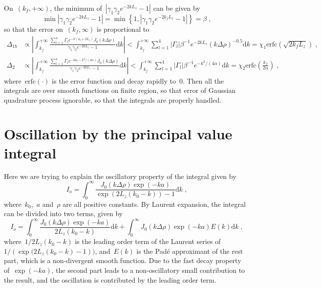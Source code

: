 \documentclass[aps,prl,reprint,showpacs,floatfix,superscriptaddress, onecolumn]{revtex4-2}
\newcommand{\D}[1]{\Delta#1} %
\newcommand{\abs}[1]{\left|#1\right|} %
\begin{document}
On~$(k_f, +\infty)$, the minimum of~$\abs{\gamma_1 \gamma_2 e^{-2k L_z} - 1}$ can be given by
\begin{equation}
    \min{\abs{\gamma_1 \gamma_2 e^{-2k L_z} - 1}} = \min{\left\{1, \abs{\gamma_1 \gamma_2 e^{-2k_f L_z} - 1}\right\}} = \beta\;,
\end{equation}
so that the error on~$(k_f, \infty)$ is proportional to
\begin{equation}
    \begin{split}
        \Delta_{1b} &\propto \abs{\int_{k_f}^{+\infty} \frac{\sum_{l = 1}^{4} \Gamma_l e^{-k (a_l + 2 L_z)} J_0(k \Delta \rho)}{\gamma_1 \gamma_2 e^{-2k L_z} - 1}   \text{d} k} < \int_{k_f}^{+\infty} \sum_{l = 1}^{4} \abs{\Gamma_l} \beta^{-1} e^{ - 2k L_z} (k \Delta \rho)^{-0.5} \text{d} k = \chi_1 \text{erfc} \left( \sqrt{2 k_f L_z} \right)\;,\\
        \Delta_2 &\propto \abs{\int_{k_f}^{+\infty} \frac{\sum_{l = 1}^{4} \Gamma_l e^{-k a_l - k^2 / (4 \alpha)} J_0(k \Delta \rho)}{\gamma_1 \gamma_2 e^{-2k L_z} - 1}   \text{d} k} < \int_{k_f}^{+\infty} \sum_{l = 1}^{4} \abs{\Gamma_l} \beta^{-1} e^{ - k^2 / (4 \alpha)} \text{d} k = \chi_2 \mathrm{erfc}\left(\frac{k_{f}}{2 \alpha}\right)\;,
    \end{split}
\end{equation}
where~$\mathrm{erfc}(\cdot)$ is the error function and decay rapidly to~$0$.
Then all the integrals are over smooth functions on finite region, so that error of Gaussian quadrature process ignorable, so that the integrals are properly handled.

\section{Oscillation by the principal value integral}

Here we are trying to explain the oscillatory property of the integral given by
\begin{equation}
    I_o = \int_0^{\infty} \frac{J_0(k \D \rho) \exp{(-k a)}}{\exp{(2L_z(k_0 - k))} - 1} \text{d}k\;,
\end{equation}
where~$k_0$,~$a$ and~$\rho$ are all positive constants.
By Laurent expansion, the integral can be divided into two terms, given by
\begin{equation}
    I_o = \int_0^{\infty} \frac{J_0(k \D \rho) \exp{(-k a)}}{2L_z(k_0 - k)} \text{d}k + \int_0^{\infty} J_0(k \D \rho) \exp{(-k a)} E(k) \text{d}k\;,
\end{equation}
where~$1/2L_z(k_0 - k)$ is the leading order term of the Laurent series of~$1/(\exp{(2L_z(k_0 - k)} - 1))$, and~$E(k)$ is the Padé approximant of the rest part, which is a non-divergent smooth function.
Due to the fast decay property of~$\exp{(-k a)}$, the second part leads to a non-oscillatory small contribution to the result, and the oscillation is contributed by the leading order term.
\end{document}
